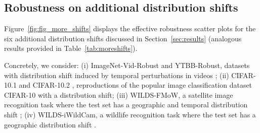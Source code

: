 \subsection{Robustness on additional distribution shifts}
\label{sec:moreshift}

Figure~\ref{fig:fig_more_shifts} displays the effective robustness scatter plots for the six additional distribution shifts discussed in Section~\ref{sec:results} (analogous results provided in Table~\ref{tab:moreshifts}).

Concretely, we consider: (i) ImageNet-Vid-Robust and YTBB-Robust, datasets with distribution shift induced by temporal perturbations in videos \cite{vidrobust};
(ii) CIFAR-10.1 \cite{pmlr-v97-recht19a} and CIFAR-10.2 \cite{lu2020harder}, reproductions of the popular image classification dataset CIFAR-10 \cite{krizhevsky2009learning} with a distribution shift;
(iii) WILDS-FMoW, a satellite image recognition task where the test set has a geographic and temporal distribution shift \cite{wilds2021, christie2018functional};
(iv) WILDS-iWildCam, a wildlife recognition task where the test set has a geographic distribution shift \cite{wilds2021, beery2021iwildcam}.






